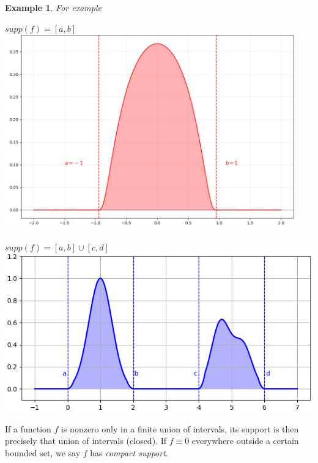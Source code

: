 \documentclass[11pt,openany]{book}
\newtheorem{example}{Example}[section]
\begin{document}
\begin{example} \noindent
For example \\
\smallskip
\begin{minipage}[t]{0.45\textwidth}
    $supp(f) = [a, b]$
    \centering
    \includegraphics[width=0.95\textwidth]{images/support_single_interval.png}
\end{minipage}
\hfill
\vline
\hfill
\begin{minipage}[t]{0.45\textwidth}
    $supp(f) = [a, b] \cup [c, d]$
    \centering
    \includegraphics[width=1.20\textwidth]{images/support_union_intervals.png}
\end{minipage}
\end{example}



\noindent
If a function \(f\) is nonzero only in a finite union of intervals, its support is then precisely that union of intervals (closed). If \(f\equiv 0\) everywhere outside a certain bounded set, we say \(f\) has \textit{compact support}.

\end{document}
